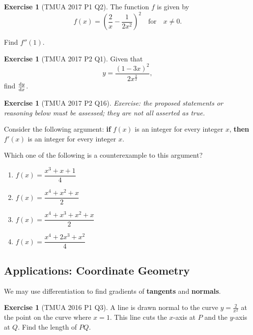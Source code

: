 \documentclass[11pt]{article}
\theoremstyle{definition}
\newtheorem{example}[theorem]{Exercise}
\theoremstyle{remark}
\newcommand{\pqty}[1]{\left(#1\right)}
\newcommand{\flatfrac}[2]{\frac{#1}{#2}}
\newcommand{\qfor}{\quad\text{for}\quad}
\begin{document}
\begin{example}[TMUA 2017 P1 Q2]\label{tmua-4-unit-017}
    The function \(f\) is given by
    \[
        f\pqty{x} = \pqty{\frac{2}{x} - \frac{1}{2x^2}}^2 \qfor x \neq 0.
    \]

    Find \(f''\pqty{1}\).
\end{example}

\begin{example}[TMUA 2017 P2 Q1]\label{tmua-4-unit-018}
    Given that
    \[
        y = \frac{\pqty{1 - 3x}^2}{2 x^{\flatfrac{3}{2}}},
    \]
    find \(\dv*{y}{x}\).
\end{example}

\begin{example}[TMUA 2017 P2 Q16]\label{tmua-4-unit-019}
\textit{Exercise: the proposed statements or reasoning below must be assessed; they are not all asserted as true.}\par

    Consider the following argument: \textbf{if} \(f\pqty{x}\) is an integer for every integer \(x\), \textbf{then} \(f'\pqty{x}\) is an integer for every integer \(x\).

    Which one of the following is a counterexample to this argument?

    \begin{enumerate}[label=\Alph*.]
        \item \(f\pqty{x} = \dfrac{x^3 + x + 1}{4}\)
        \item \(f\pqty{x} = \dfrac{x^4 + x^2 + x}{2}\)
        \item \(f\pqty{x} = \dfrac{x^4 + x^3 + x^2 + x}{2}\)
        \item \(f\pqty{x} = \dfrac{x^4 + 2 x^3 + x^2}{4}\)
    \end{enumerate}
\end{example}

\subsection{Applications: Coordinate Geometry}\label{tmua-4-subsection-005}

We may use differentiation to find gradients of \textbf{tangents} and \textbf{normals}.


\begin{example}[TMUA 2016 P1 Q3]\label{tmua-4-unit-020}
    A line is drawn normal to the curve \(y = \flatfrac{2}{x^2}\) at the point on the curve where \(x = 1\). This line cuts the \(x\)-axis at \(P\) and the \(y\)-axis at \(Q\). Find the length of \(PQ\).
\end{example}
\end{document}
